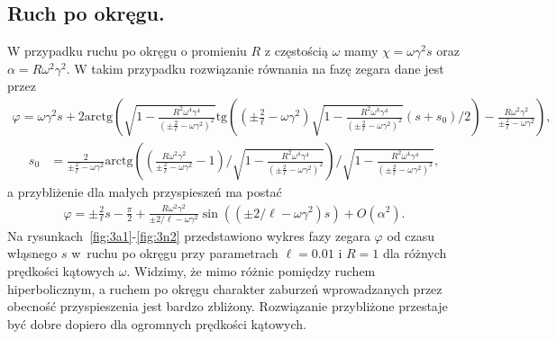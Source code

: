 \subsection{Ruch po okręgu.}
W przypadku ruchu po okręgu o promieniu $R$ z 
częstością $\omega$ mamy
$\chi = \omega \gamma^2 s$ oraz 
$\alpha = R\omega^2\gamma^2 $.
W takim przypadku rozwiązanie równania na fazę zegara dane jest przez
\begin{align}\nonumber
\varphi = \omega\gamma^2 s +  
2\text{arctg} \left( 
\sqrt{ 1-\frac{R^2\omega^4\gamma^4}{\left( \pm \frac{2}{\ell} 
-\omega\gamma^2 \right)^2 } }
\text{tg} \left( 
\left( \pm \frac{2}{\ell} -\omega\gamma^2 \right)
\sqrt{ 1-\frac{R^2\omega^4\gamma^4}{\left( \pm \frac{2}{\ell} 
-\omega\gamma^2 \right)^2 } }(s + s_0)/2
\right)  
- \frac{R \omega^2 \gamma^2}{\pm \frac{2}{\ell} -\omega\gamma^2}
\right),
\end{align}
\begin{align*}
s_0 & = \frac{2}{\pm \frac{2}{\ell} -\omega\gamma^2} 
\text{arctg}  
\left( \left( \frac{R \omega^2 \gamma^2}{\pm \frac{2}{\ell} 
-\omega\gamma^2} - 1 \right) \Big /  
\sqrt{ 1-\frac{R^2\omega^4\gamma^4}{\left( \pm \frac{2}{\ell} 
-\omega\gamma^2 \right)^2 } }
\right)\Big /   
\sqrt{ 1-\frac{R^2\omega^4\gamma^4}{\left( \pm \frac{2}{\ell} 
-\omega\gamma^2 \right)^2 } } ,
\end{align*}
a przybliżenie dla małych przyspieszeń ma postać 
\begin{align}\nonumber
\varphi =  \pm \frac{2}{\ell}s - \frac{\pi}{2} 
+
\frac{R \omega^2 \gamma^2}{\pm 2/\ell - \omega\gamma^2}
\sin ( (\pm 2/\ell - \omega\gamma^2) s )  
+O(\alpha^2).
\end{align}
Na rysunkach~\ref{fig:3a1}-\ref{fig:3n2} przedstawiono 
wykres fazy zegara $\varphi$ od czasu włąsnego $s$ 
w~ruchu po okręgu przy parametrach
$\ell=0.01$ i $R=1$ dla różnych prędkości kątowych $\omega$. 
Widzimy, że mimo różnic pomiędzy ruchem hiperbolicznym, a 
ruchem po okręgu charakter zaburzeń wprowadzanych przez 
obecność przyspieszenia jest bardzo zbliżony.
Rozwiązanie przybliżone przestaje być dobre dopiero dla 
ogromnych prędkości kątowych.
